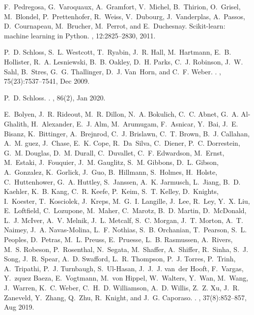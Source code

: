 \documentclass[webpdf,contemporary,large,single]{oup-authoring-template}%
\theoremstyle{thmstyleone}%
\theoremstyle{thmstyletwo}%
\theoremstyle{thmstylethree}%
\begin{document}
\begin{thebibliography}{10}
F.~Pedregosa, G.~Varoquaux, A.~Gramfort, V.~Michel, B.~Thirion, O.~Grisel,
  M.~Blondel, P.~Prettenhofer, R.~Weiss, V.~Dubourg, J.~Vanderplas, A.~Passos,
  D.~Cournapeau, M.~Brucher, M.~Perrot, and E.~Duchesnay.
\newblock Scikit-learn: machine learning in {P}ython.
, 12:2825--2830, 2011.

P.~D. Schloss, S.~L. Westcott, T.~Ryabin, J.~R. Hall, M.~Hartmann, E.~B.
  Hollister, R.~A. Lesniewski, B.~B. Oakley, D.~H. Parks, C.~J. Robinson, J.~W.
  Sahl, B.~Stres, G.~G. Thallinger, D.~J. Van~Horn, and C.~F. Weber.
.
, 75(23):7537--7541, Dec 2009.

P.~D. Schloss.
.
, 86(2), Jan 2020.

E.~Bolyen, J.~R. Rideout, M.~R. Dillon, N.~A. Bokulich, C.~C. Abnet, G.~A.
  Al-Ghalith, H.~Alexander, E.~J. Alm, M.~Arumugam, F.~Asnicar, Y.~Bai, J.~E.
  Bisanz, K.~Bittinger, A.~Brejnrod, C.~J. Brislawn, C.~T. Brown, B.~J.
  Callahan, A.~M. guez, J.~Chase, E.~K. Cope, R.~Da~Silva, C.~Diener, P.~C.
  Dorrestein, G.~M. Douglas, D.~M. Durall, C.~Duvallet, C.~F. Edwardson,
  M.~Ernst, M.~Estaki, J.~Fouquier, J.~M. Gauglitz, S.~M. Gibbons, D.~L.
  Gibson, A.~Gonzalez, K.~Gorlick, J.~Guo, B.~Hillmann, S.~Holmes, H.~Holste,
  C.~Huttenhower, G.~A. Huttley, S.~Janssen, A.~K. Jarmusch, L.~Jiang, B.~D.
  Kaehler, K.~B. Kang, C.~R. Keefe, P.~Keim, S.~T. Kelley, D.~Knights,
  I.~Koester, T.~Kosciolek, J.~Kreps, M.~G.~I. Langille, J.~Lee, R.~Ley, Y.~X.
  Liu, E.~Loftfield, C.~Lozupone, M.~Maher, C.~Marotz, B.~D. Martin,
  D.~McDonald, L.~J. McIver, A.~V. Melnik, J.~L. Metcalf, S.~C. Morgan, J.~T.
  Morton, A.~T. Naimey, J.~A. Navas-Molina, L.~F. Nothias, S.~B. Orchanian,
  T.~Pearson, S.~L. Peoples, D.~Petras, M.~L. Preuss, E.~Pruesse, L.~B.
  Rasmussen, A.~Rivers, M.~S. Robeson, P.~Rosenthal, N.~Segata, M.~Shaffer,
  A.~Shiffer, R.~Sinha, S.~J. Song, J.~R. Spear, A.~D. Swafford, L.~R.
  Thompson, P.~J. Torres, P.~Trinh, A.~Tripathi, P.~J. Turnbaugh, S.~Ul-Hasan,
  J.~J.~J. van~der Hooft, F.~Vargas, Y.~zquez Baeza, E.~Vogtmann, M.~von
  Hippel, W.~Walters, Y.~Wan, M.~Wang, J.~Warren, K.~C. Weber, C.~H.~D.
  Williamson, A.~D. Willis, Z.~Z. Xu, J.~R. Zaneveld, Y.~Zhang, Q.~Zhu,
  R.~Knight, and J.~G. Caporaso.
.
, 37(8):852--857, Aug 2019.


\end{thebibliography}
\end{document}
